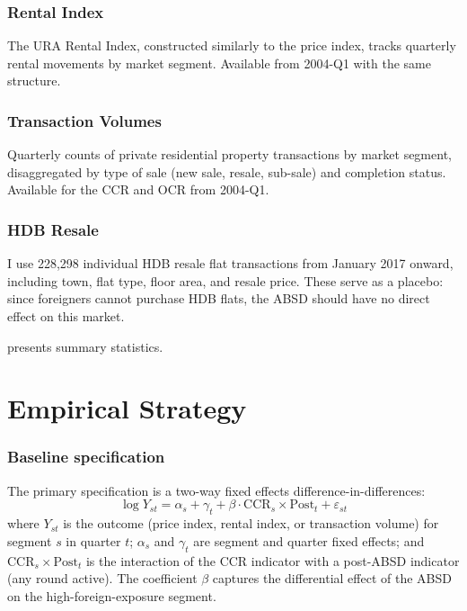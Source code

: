 \documentclass[12pt]{article}
\begin{document}
\subsubsection*{Rental Index} The URA Rental Index, constructed similarly to the price index, tracks quarterly rental movements by market segment. Available from 2004-Q1 with the same structure.

\subsubsection*{Transaction Volumes} Quarterly counts of private residential property transactions by market segment, disaggregated by type of sale (new sale, resale, sub-sale) and completion status. Available for the CCR and OCR from 2004-Q1.

\subsubsection*{HDB Resale} I use 228,298 individual HDB resale flat transactions from January 2017 onward, including town, flat type, floor area, and resale price. These serve as a placebo: since foreigners cannot purchase HDB flats, the ABSD should have no direct effect on this market.

 presents summary statistics.



\section{Empirical Strategy}\label{sec:method}

\subsubsection*{Baseline specification} The primary specification is a two-way fixed effects difference-in-differences:
\begin{equation}\label{eq:baseline}
\log Y_{st} = \alpha_s + \gamma_t + \beta \cdot \text{CCR}_s \times \text{Post}_t + \varepsilon_{st}
\end{equation}
where $Y_{st}$ is the outcome (price index, rental index, or transaction volume) for segment $s$ in quarter $t$; $\alpha_s$ and $\gamma_t$ are segment and quarter fixed effects; and $\text{CCR}_s \times \text{Post}_t$ is the interaction of the CCR indicator with a post-ABSD indicator (any round active). The coefficient $\beta$ captures the differential effect of the ABSD on the high-foreign-exposure segment.
\end{document}
